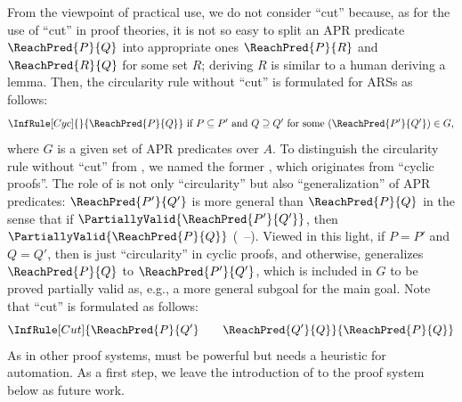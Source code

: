From the viewpoint of practical use, we do not consider ``cut'' because, as for the use of ``cut'' in proof theories, it is not so easy to split an APR predicate $\ReachPred{P}{Q}$ into appropriate ones $\ReachPred{P}{R}$ and $\ReachPred{R}{Q}$ for some set $R$;
deriving $R$ is similar to a human deriving a lemma.
Then, the circularity rule without ``cut'' is formulated for ARSs as follows:
\[
	\InfRule[Cyc]{}{\ReachPred{P}{Q}
	}
	~\mbox{if $P \subseteq P'$ and $Q \supseteq Q'$ for some $(\ReachPred{P'}{Q'}) \in G$,}
\]
where $G$ is a given set of APR predicates over $A$.
To distinguish the circularity rule without ``cut'' from , we named the former , which originates from ``cyclic proofs''.
The role of  is not only ``circularity'' but also ``generalization'' of APR predicates:
$\ReachPred{P'}{Q'}$ is more general than $\ReachPred{P}{Q}$
in the sense that
if
$\PartiallyValid{\ReachPred{P'}{Q'}}$,
then
$\PartiallyValid{\ReachPred{P}{Q}}$
(~--).
Viewed in this light,
if $P=P'$ and $Q=Q'$, then  is just ``circularity'' in cyclic proofs,
and
otherwise,  generalizes $\ReachPred{P}{Q}$ to $\ReachPred{P'}{Q'}$, which is included in $G$ to be proved partially valid as, e.g., a more general subgoal for the main goal.
Note that ``cut'' is formulated as follows:
\[
	\InfRule[Cut]{\ReachPred{P}{Q'}
		\qquad
		\ReachPred{Q'}{Q}
	}{\ReachPred{P}{Q}
	}
\]
As in other proof systems,  must be powerful but needs a heuristic for automation.
As a first step, we leave the introduction of  to the proof system below as future work.

